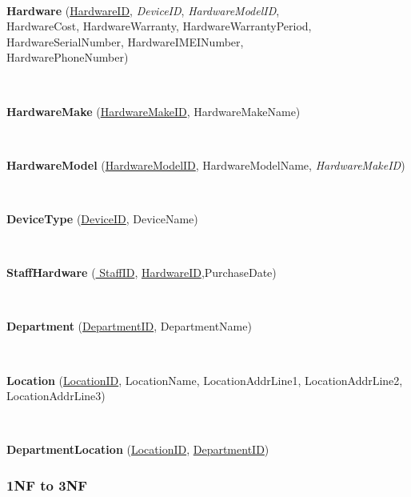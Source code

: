 \

\textbf{Hardware}  (\underline{HardwareID}, \textit{DeviceID},  \textit{HardwareModelID},\\ HardwareCost, HardwareWarranty, HardwareWarrantyPeriod,\\ HardwareSerialNumber, 		HardwareIMEINumber, \\HardwarePhoneNumber)

\

\textbf{HardwareMake} (\underline{HardwareMakeID}, HardwareMakeName)

\

\textbf{HardwareModel} (\underline{HardwareModelID}, HardwareModelName, \textit{HardwareMakeID})

\


\textbf{DeviceType}  (\underline{DeviceID}, DeviceName)


\


\textbf{StaffHardware}  (\underline{ StaffID}, \underline{ HardwareID},PurchaseDate)


\


\textbf{Department}  (\underline{DepartmentID}, DepartmentName)


\


\textbf{Location}  (\underline{LocationID}, LocationName, LocationAddrLine1, LocationAddrLine2, LocationAddrLine3)

\

\textbf{DepartmentLocation} (\underline{LocationID}, \underline{DepartmentID})




\subsubsection{1NF to 3NF}

